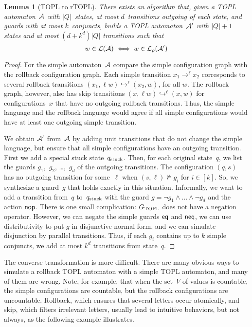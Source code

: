 \documentclass{article} %
\newtheorem{lemma}{Lemma}
\theoremstyle{definition}
\theoremstyle{remark}
\begin{document}
\begin{lemma}[TOPL to rTOPL]\label{lemma:topl-to-rtopl}
There exists an algorithm that, given a TOPL automaton~${\cal A}$ with $|Q|$~states, at most $d$~transitions outgoing of each state, and guards with at most $k$~conjuncts, builds a TOPL automaton~${\cal A}'$ with $|Q|+1$ states and at most $(d+k^d)|Q|$ transitions such that
\[ w\in{\cal L}({\cal A}) \iff w\in{\cal L}_\rho({\cal A}')\]
\end{lemma}
\begin{proof}
For the simple automaton~${\cal A}$ compare the simple configuration graph with the rollback configuration graph.
Each simple transition $x_1\to^\ell x_2$ corresponds to several rollback transitions $ (x_1,\ell w)\hookrightarrow^\ell (x_2,w)$, for all $w$.
The rollback graph, however, also has skip transitions $(x,\ell w)\hookrightarrow^\ell (x,w)$ for configurations~$x$ that have no outgoing rollback transitions.
Thus, the simple language and the rollback language would agree if all simple configurations would have at least one outgoing simple transition.

We obtain ${\cal A}'$ from~${\cal A}$ by adding unit transitions that do not change the simple language, but ensure that all simple configurations have an outgoing transition.
First we add a special stuck state~$q_{\rm stuck}$.
Then, for each original state~$q$, we list the guards $g_1$,~$g_2$, \dots,~$g_d$ of the outgoing transitions.
The configuration $(q,s)$ has no outgoing transition for some~$\ell$ when $(s,\ell)\not\models g_i$ for $i\in[k]$.
So, we synthesize a guard~$g$ that holds exactly in this situation.
Informally, we want to add a transition from~$q$ to~$q_{\rm stuck}$ with the guard $g=\lnot g_1\land\ldots\land\lnot g_d$ and the action ${\sf nop}$.
There is one small complication: $G_{\rm TOPL}$ does not have a negation operator.
However, we can negate the simple guards ${\sf eq}$ and ${\sf neq}$, we can use distributivity to put $g$ in disjunctive normal form, and we can simulate disjunction by parallel transitions.
Thus, if each $g_i$ contains up to $k$ simple conjuncts, we add at most $k^d$ transitions from state~$q$.
\end{proof}

The converse transformation is more difficult.
There are many obvious ways to simulate a rollback TOPL automaton with a simple TOPL automaton, and many of them are wrong.
Note, for example, that when the set~$V$ of values is countable, the simple configurations are countable, but the rollback configurations are uncountable.
Rollback, which ensures that several letters occur atomically, and skip, which filters irrelevant letters, usually lead to intuitive behaviors, but not always, as the following example illustrates.
\end{document}
